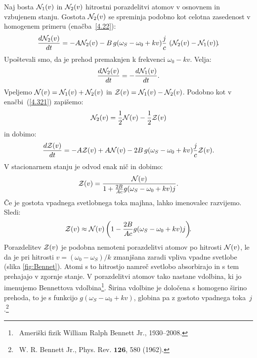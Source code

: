 Naj bosta ${\cal N}_{1}(v)$ in ${\cal N}_{2}(v)$ hitrostni porazdelitvi
atomov v osnovnem in vzbujenem stanju. Gostota
${\cal N}_{2}(v)$ se spreminja podobno kot celotna
zasedenost v homogenem primeru (enačba~\ref{4.22}):
\begin{equation}
\frac{d{\cal N}_{2}(v)}{dt}=-A{\cal N}_{2}(v) -B\, g(\omega_S-\omega_{0}+kv)
\frac{j}{c}\,
\left({\cal N}_{2}(v)-{\cal N}_{1}(v)\right)\!\!.
\label{4.85}
\end{equation}
Upoštevali smo, da je prehod premaknjen k frekvenci
$\omega_{0}-kv$. Velja:
\begin{equation}
 \frac{d{\cal N}_{2}(v)}{dt}=-\frac{d{\cal N}_{1}(v)}{dt}.
\label{4.86}
\end{equation}
Vpeljemo ${\cal N}(v)={\cal N}_{1}(v)+{\cal N}_{2}(v)$ in 
${\cal Z}(v)={\cal N}_{1}(v)-{\cal N}_{2}(v)$. Podobno kot 
v enačbi~(\ref{4.321}) zapišemo:
\begin{equation}
{\cal N}_{2}(v)=\frac{1}{2}{\cal N}(v)-\frac{1}{2}{\cal Z}(v)
\end{equation}
in dobimo:
\begin{equation}
\frac{d{\cal Z}(v)}{dt}=-A{\cal Z}(v)+A{\cal N}(v)
-2B\,g(\omega_S-\omega_{0}+kv)\frac{j}{c}
{\cal Z}(v).
\label{4.87}
\end{equation}
V stacionarnem stanju je odvod enak nič in dobimo:
\begin{equation}
{\cal Z}(v)=\frac{{\cal N}(v)}{1+\frac{2B}{Ac}g(\omega_S-\omega_{0}+kv)j}.
\label{4.88}
\end{equation}
 Če je gostota vpadnega svetlobnega toka majhna, lahko imenovalec razvijemo. Sledi:
\begin{equation}
{\cal Z}(v)\approx{\cal N}(v)\left(1-\frac{2B}{Ac}g(\omega_S-\omega_{0}+kv)j\right)\!\!.
\label{4.89}
\end{equation}
Porazdelitev ${\cal Z}(v)$ je podobna nemoteni porazdelitvi atomov
po hitrosti ${\cal N}(v)$, le da je pri hitrosti $v=(\omega_{0}-\omega_S)/k$
zmanjšana zaradi vpliva vpadne svetlobe (slika \ref{fig:Bennet}). 
Atomi s to hitrostjo namreč svetlobo
absorbirajo in s tem prehajajo v zgornje stanje. V porazdelitvi
atomov tako nastane vdolbina, ki jo imenujemo
Bennettova vdolbina\footnote{~Ameriški fizik William Ralph Bennett Jr., 
1930--2008.}. Širina vdolbine je določena
s homogeno širino prehoda, to je s funkcijo $g(\omega_S-\omega_{0}+kv)$, 
globina pa z gostoto vpadnega toka~$j$.\footnote{~W. R. Bennett Jr., Phys. Rev. $\mathbf{126}$, 580 (1962).}

